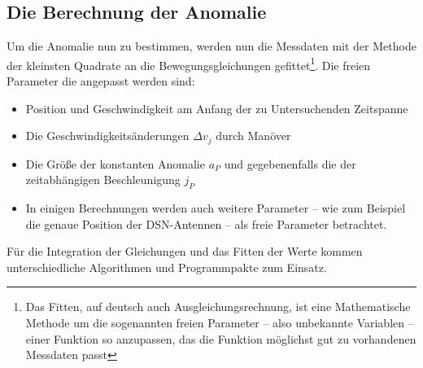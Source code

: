
\subsection{Die Berechnung der Anomalie}
Um die Anomalie nun zu bestimmen, werden nun die Messdaten mit der Methode der kleinsten Quadrate an die Bewegungsgleichungen gefittet\footnote{Das Fitten, auf deutsch auch Ausgleichungsrechnung, ist eine Mathematische Methode um die sogenannten freien Parameter – also unbekannte Variablen – einer Funktion so anzupassen, das die Funktion möglichst gut zu vorhandenen Messdaten passt}. Die freien Parameter die angepasst werden sind:
\begin{itemize}
\item Position und Geschwindigkeit am Anfang der zu Untersuchenden Zeitspanne
\item Die Geschwindigkeitsänderungen $\Delta v_j$ durch Manöver
\item Die Größe der konstanten Anomalie $a_P$ und gegebenenfalls die der zeitabhängigen Beschleunigung $j_P$
\item In einigen Berechnungen werden auch weitere Parameter – wie zum Beispiel die genaue Position der DSN-Antennen – als freie Parameter betrachtet.
\end{itemize}
Für die Integration der Gleichungen und das Fitten der Werte kommen unterschiedliche Algorithmen und Programmpakte zum Einsatz.


